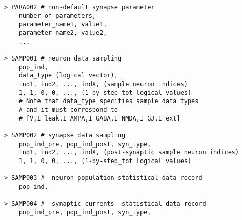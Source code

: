 \documentclass{article}
\begin{document}
\begin{lstlisting}[mathescape]
> PARA002 # non-default synapse parameter
	number_of_parameters,
	parameter_name1, value1,
	parameter_name2, value2,
	...

> SAMP001 # neuron data sampling 
	pop_ind,
	data_type (logical vector),
	ind1, ind2, ..., indX, (sample neuron indices)
	1, 1, 0, 0, ..., (1-by-step_tot logical values)
	# Note that data_type specifies sample data types
	# and it must correspond to 
	# [V,I_leak,I_AMPA,I_GABA,I_NMDA,I_GJ,I_ext]

> SAMP002 # synapse data sampling 
	pop_ind_pre, pop_ind_post, syn_type,
	ind1, ind2, ..., indX, (post-synaptic sample neuron indices)
	1, 1, 0, 0, ..., (1-by-step_tot logical values)
	
> SAMP003 #  neuron population statistical data record
	pop_ind,
	
> SAMP004 #  synaptic currents  statistical data record
	pop_ind_pre, pop_ind_post, syn_type,

\end{lstlisting}
\end{document}
